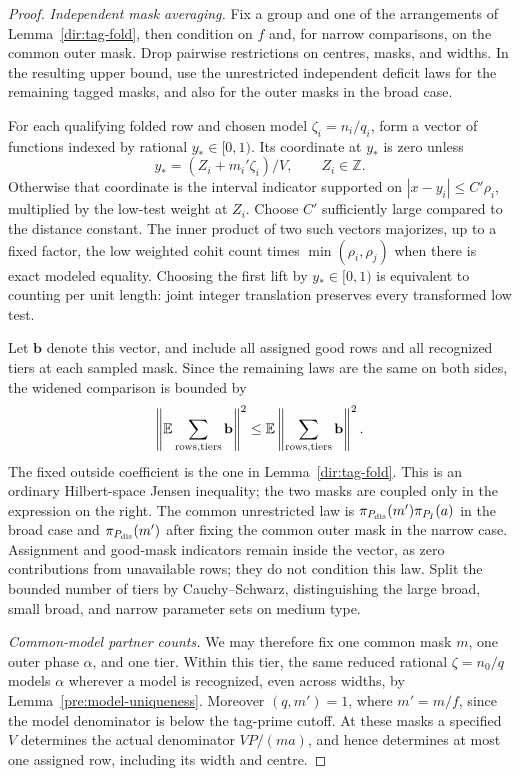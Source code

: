 \begin{proof}
\emph{Independent mask averaging.}
Fix a group and one of the arrangements of Lemma~\ref{dir:tag-fold}, then
condition on $f$ and, for narrow comparisons, on the common outer mask.
Drop pairwise restrictions on centres, masks, and widths. In the
resulting upper bound, use the unrestricted independent deficit laws
for the remaining tagged masks, and also for the outer masks in the
broad case.

For each qualifying folded row and chosen model
$\zeta_i=n_i/q_i$, form a vector of functions indexed by rational
$y_*\in[0,1)$. Its coordinate at $y_*$ is zero unless
\[
 y_*=(Z_i+m_i'\zeta_i)/V,\qquad Z_i\in\mathbb Z.
\]
Otherwise that coordinate is the interval indicator supported on
$|x-y_i|\le C'\rho_i$, multiplied by the low-test weight at $Z_i$.
Choose $C'$ sufficiently large compared to the distance constant.
The inner product of two such vectors majorizes, up to a fixed factor,
the low weighted cohit count times $\min(\rho_i,\rho_j)$ when there is
exact modeled equality. Choosing the first lift by $y_*\in[0,1)$ is
equivalent to counting per unit length: joint integer translation
preserves every transformed low test.

Let $\mathbf b$ denote this vector, and include all assigned good rows
and all recognized tiers at each sampled mask. Since the remaining laws
are the same on both sides, the widened comparison is bounded by
\[
 \left\|\mathbb E\sum_{\rm rows,tiers}\mathbf b\right\|^2
 \le
 \mathbb E\left\|\sum_{\rm rows,tiers}\mathbf b\right\|^2.
\]
The fixed outside coefficient is the one in
Lemma~\ref{dir:tag-fold}. This is an ordinary Hilbert-space Jensen
inequality; the two masks are coupled only in the expression on the
right. The common unrestricted law is
$\pi_{P_{\rm dis}}(m')\pi_{P_I}(a)$ in the broad case and
$\pi_{P_{\rm dis}}(m')$ after fixing the common outer mask in the narrow
case. Assignment and good-mask indicators remain inside the vector,
as zero contributions from unavailable rows; they do not condition
this law. Split the bounded number of tiers by Cauchy--Schwarz,
distinguishing the large broad, small broad, and narrow parameter
sets on medium type.

\emph{Common-model partner counts.}
We may therefore fix one common mask $m$, one outer phase $\alpha$, and
one tier. Within this tier, the same reduced rational $\zeta=n_0/q$
models $\alpha$ wherever a model is recognized, even across widths, by
Lemma~\ref{pre:model-uniqueness}. Moreover $(q,m')=1$, where
$m'=m/f$, since the model denominator is below the tag-prime cutoff.
At these masks a specified $V$ determines the actual denominator
$VP/(ma)$, and hence determines at most one assigned row, including its
width and centre.


\end{proof}
